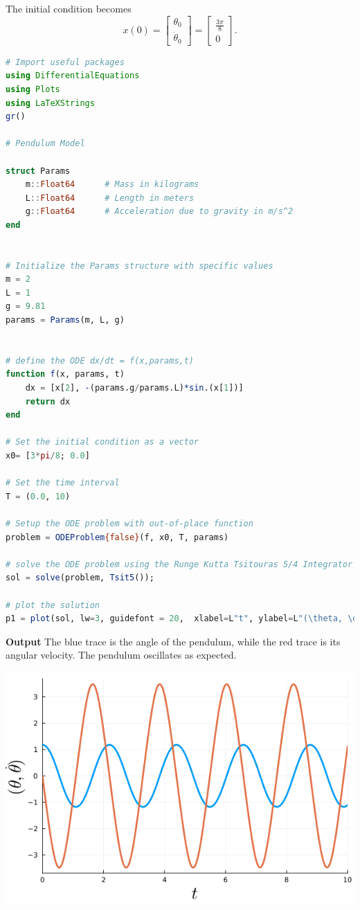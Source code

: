 The initial condition becomes
$$x(0) = \left[ \begin{array}{c} \theta_0\\[1em] \dot{\theta}_0 \end{array} \right] = \left[ \begin{array}{c} \frac{3 \pi}{8}\\[1em] 0 \end{array} \right].$$

\begin{lstlisting}[language=Julia,style=mystyle]
# Import useful packages
using DifferentialEquations
using Plots 
using LaTeXStrings
gr()

# Pendulum Model

struct Params
    m::Float64      # Mass in kilograms
    L::Float64      # Length in meters
    g::Float64      # Acceleration due to gravity in m/s^2
end


# Initialize the Params structure with specific values
m = 2
L = 1
g = 9.81
params = Params(m, L, g)


# define the ODE dx/dt = f(x,params,t)
function f(x, params, t) 
    dx = [x[2], -(params.g/params.L)*sin.(x[1])]
    return dx
end

# Set the initial condition as a vector
x0= [3*pi/8; 0.0]

# Set the time interval
T = (0.0, 10) 

# Setup the ODE problem with out-of-place function
problem = ODEProblem{false}(f, x0, T, params)

# solve the ODE problem using the Runge Kutta Tsitouras 5/4 Integrator
sol = solve(problem, Tsit5());

# plot the solution
p1 = plot(sol, lw=3, guidefont = 20,  xlabel=L"t", ylabel=L"(\theta, \dot{\theta})", legend=false)
\end{lstlisting}
\textbf{Output} 
The blue trace is the angle of the pendulum, while the red trace is its angular velocity. The pendulum oscillates as expected.
\begin{center}
    \includegraphics[width=0.6\columnwidth]{graphics/Chap09/PendulumSimulationChap09.png}
\end{center}

